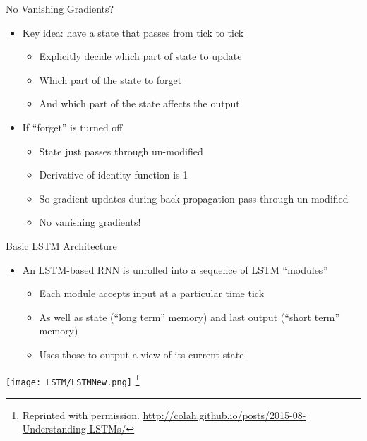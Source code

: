 \documentclass[aspectratio=169]{beamer}
\begin{document}
\begin{frame}{No Vanishing Gradients?}
        \begin{itemize}
	\item Key idea: have a state that passes from tick to tick
	\begin{itemize}
	\item Explicitly decide which part of state to update
	\item Which part of the state to forget
	\item And which part of the state affects the output
	\end{itemize}
	\item If ``forget'' is turned off 
	\begin{itemize}
	\item State just passes through un-modified
	\item Derivative of identity function is 1
	\item So gradient updates during back-propagation pass through un-modified
	\item No vanishing gradients!
	\end{itemize}
\end{itemize}
\end{frame}
\begin{frame}{Basic LSTM Architecture}
\begin{itemize}
	\item An LSTM-based RNN is unrolled into a sequence of LSTM ``modules''
	\begin{itemize}
	\item Each module accepts input at a particular time tick
	\item As well as state (``long term'' memory) and last output (``short term'' memory)
	\item Uses those to output a view of its current state	
	\end{itemize}
\end{itemize}
\texttt{[image: LSTM/LSTMNew.png]}
\footnote{Reprinted with permission. \url{http://colah.github.io/posts/2015-08-Understanding-LSTMs/}}

\end{frame}
\end{document}
